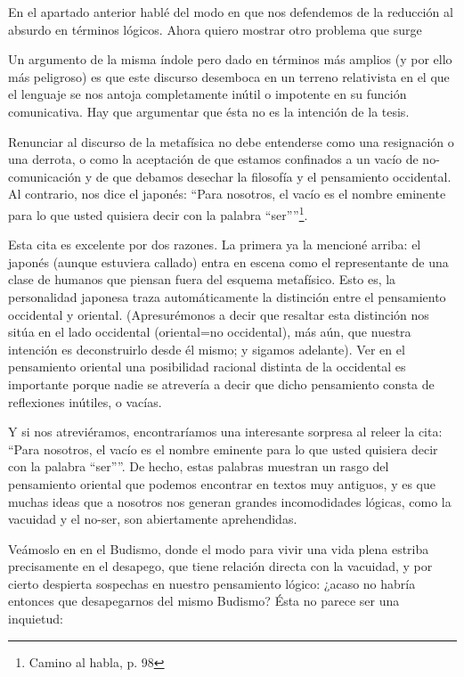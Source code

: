 En el apartado anterior hablé del modo en que
nos defendemos de la reducción al absurdo en
términos lógicos. Ahora quiero mostrar otro
problema que surge

Un argumento de la misma índole pero dado en
términos más amplios (y por ello más
peligroso) es que este discurso desemboca en
un terreno relativista en el que el lenguaje
se nos antoja completamente inútil o
impotente en su función comunicativa. Hay que
argumentar que ésta no es la intención de la
tesis.

Renunciar al discurso de la metafísica no
debe entenderse como una resignación o una
derrota, o como la aceptación de que estamos
confinados a un vacío de no-comunicación y de
que debamos desechar la filosofía y el
pensamiento occidental. Al contrario, nos
dice el japonés: ``Para nosotros, el vacío es
el nombre eminente para lo que usted quisiera
decir con la palabra
``ser''''\footnote{Camino al habla, p. 98}.

Esta cita es excelente por dos razones. La
primera ya la mencioné arriba: el japonés
(aunque estuviera callado) entra en escena
como el representante de una clase de humanos
que piensan fuera del esquema metafísico.
Esto es, la personalidad japonesa traza
automáticamente la distinción entre el
pensamiento occidental y oriental.
(Apresurémonos a decir que resaltar esta
distinción nos sitúa en el lado occidental
(oriental=no occidental), más aún, que
nuestra intención es deconstruirlo desde él
mismo; y sigamos adelante). Ver en el
pensamiento oriental una posibilidad racional
distinta de la occidental es importante
porque nadie se atrevería a decir que dicho
pensamiento consta de reflexiones inútiles, o
vacías.

Y si nos atreviéramos, encontraríamos una
interesante sorpresa al releer la cita:
``Para nosotros, el vacío es el nombre
eminente para lo que usted quisiera decir con
la palabra ``ser''''. De hecho, estas
palabras muestran un rasgo del pensamiento
oriental que podemos encontrar en textos muy
antiguos, y es que muchas ideas que a
nosotros nos generan grandes incomodidades
lógicas, como la vacuidad y el no-ser, son
abiertamente aprehendidas.

Veámoslo en en el Budismo, donde el modo para
vivir una vida plena estriba precisamente en
el desapego, que tiene relación directa con
la vacuidad, y por cierto despierta sospechas
en nuestro pensamiento lógico: ¿acaso no
habría entonces que desapegarnos del mismo
Budismo? Ésta no parece ser una inquietud:

